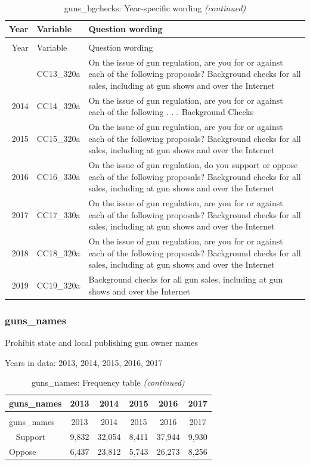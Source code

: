 \documentclass[12pt]{article}
\begin{document}
\begin{longtable}[t]{rl>{\raggedright\arraybackslash}p{10cm}}
\caption{\label{tab:unnamed-chunk-4}guns\_bgchecks: Year-specific wording}\\
\toprule
Year & Variable & Question wording\\
\midrule
\endfirsthead
\caption[]{guns\_bgchecks: Year-specific wording \textit{(continued)}}\\
\toprule
Year & Variable & Question wording\\
\midrule
\endhead
\
\endfoot
\bottomrule
\endlastfoot
2013 & CC13\_320a & On the issue of gun regulation, are you for or against each of the following proposals? Background checks for all sales, including at gun shows and over the Internet\\
2014 & CC14\_320a & On the issue of gun regulation, are you for or against each of the following . . . Background Checks\\
2015 & CC15\_320a & On the issue of gun regulation, are you for or against each of the following proposals? Background checks for all sales, including at gun shows and over the Internet\\
2016 & CC16\_330a & On the issue of gun regulation, do you support or oppose each of the following proposals? Background checks for all sales, including at gun shows and over the Internet\\
2017 & CC17\_330a & On the issue of gun regulation, are you for or against each of the following proposals? Background checks for all sales, including at gun shows and over the Internet\\
2018 & CC18\_320a & On the issue of gun regulation, are you for or against each of the following proposals? Background checks for all sales, including at gun shows and over the Internet\\
2019 & CC19\_320a & Background checks for all gun sales, including at gun shows and over the Internet\\*
\end{longtable}

\subsubsection{guns\_names}\label{guns_names}

Prohibit state and local publishing gun owner names

Years in data: 2013, 2014, 2015, 2016, 2017

\begin{longtable}[t]{lccccc}
\caption{\label{tab:unnamed-chunk-4}guns\_names: Frequency table}\\
\toprule
guns\_names & 2013 & 2014 & 2015 & 2016 & 2017\\
\midrule
\endfirsthead
\caption[]{guns\_names: Frequency table \textit{(continued)}}\\
\toprule
guns\_names & 2013 & 2014 & 2015 & 2016 & 2017\\
\midrule
\endhead
\
\endfoot
\bottomrule
\endlastfoot
Support & 9,832 & 32,054 & 8,411 & 37,944 & 9,930\\
Oppose & 6,437 & 23,812 & 5,743 & 26,273 & 8,256\\*
\end{longtable}
\end{document}

